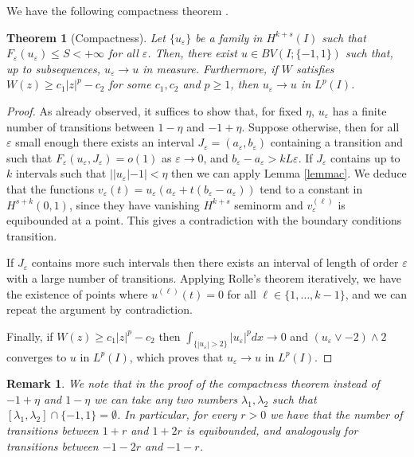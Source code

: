 \documentclass{article}
\newtheorem{remark}[lemma]{Remark}
\newtheorem{theorem}[lemma]{Theorem}
\newcommand{\e}{\varepsilon}
\begin{document}
We have the following compactness theorem  \cite[Theorem 2]{Solci}.

\begin{theorem}[Compactness]\label{compth} 
Let $\{u_\e\}$ be a family in $H^{k+s}(I)$ such that $F_\e(u_\e)\le S<+\infty$ for all $\e$. Then, there exist $u\in BV(I;\{-1,1\})$ such that, up to subsequences, $u_{\e}\to u$ in measure. 
 Furthermore, if  $W$ satisfies $W(z)\ge c_1|z|^p-c_2$ for some $c_1,c_2$ and $p\ge 1$, then $u_{\e}\to u$ in $L^p(I)$.
\end{theorem} 
 
 \begin{proof} As already observed, it suffices to show that, for fixed $\eta$, $u_\e$ has a finite number of transitions between $1-\eta$ and $-1+\eta$. 
Suppose otherwise, then for all $\e$ small enough there exists an interval $J_\e=(a_\e, b_\e)$ containing a transition and such that $F_\e(u_\e, J_\e)=o(1)$ as $\e\to 0$, and $b_\e-a_\e> k L\e$. 
If $J_\e$ contains up to $k$ intervals such that $||u_\e|-1|<\eta$ then we can apply Lemma \ref{lemmac}.
We deduce that the functions $v_\e(t)= u_\e(a_\e +t(b_\e-a_\e))$ tend to a constant in $H^{s+k}(0,1)$, since they have vanishing $H^{k+s}$ seminorm and $v^{(\ell)}_\e$ is equibounded at a point. This gives a contradiction with the boundary conditions transition.

If $J_\e$ contains more such intervals then there exists an interval of length of order $\e$ with a large number of transitions. Applying Rolle's theorem iteratively, we have the existence of points where $u^{(\ell)}(t)=0$ for all $\ell\in\{1,\ldots,k-1\}$, and we can repeat the argument by contradiction.

Finally, if $W(z)\ge c_1|z|^p-c_2$ then  $\int_{\{|u_\e|>2\}}|u_\e|^p dx\to 0$ and $(u_\e\vee{-2})\wedge 2$ converges to $u$ in $L^p(I)$, which proves that $u_\e\to u$  in $L^p(I)$.
\end{proof}

\begin{remark}\label{limitat}\rm
We note that in the proof of the compactness theorem instead of $-1+\eta$ and $1-\eta$ we can take any two numbers $\lambda_1,\lambda_2$ such that $[\lambda_1,\lambda_2]\cap\{-1,1\}=\emptyset$. In particular, for every $r>0$ we have that the number of transitions between $1+r$ and $1+2r$ is equibounded, and analogously for transitions between $-1-2r$ and $-1-r$.
\end{remark}
\end{document}
